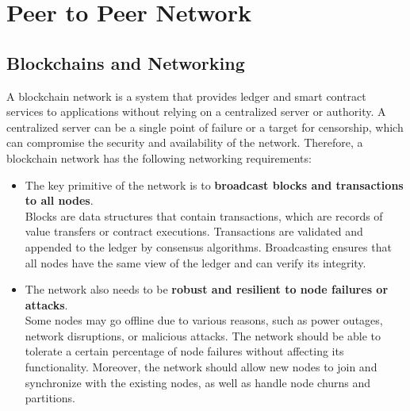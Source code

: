 \chapter{Peer to Peer Network}
\section{Blockchains and Networking}
A blockchain network is a system that provides ledger and smart contract services to applications without relying on a centralized server or authority. A centralized server can be a single point of failure or a target for censorship, which can compromise the security and availability of the network. Therefore, a blockchain network has the following networking requirements:
\begin{itemize}
    \item 
    The key primitive of the network is to \textbf{broadcast blocks and transactions to all nodes}.\\ Blocks are data structures that contain transactions, which are records of value transfers or contract executions. Transactions are validated and appended to the ledger by consensus algorithms. Broadcasting ensures that all nodes have the same view of the ledger and can verify its integrity.
    \item 
    The network also needs to be \textbf{robust and resilient to node failures or attacks}. \\ Some nodes may go offline due to various reasons, such as power outages, network disruptions, or malicious attacks. The network should be able to tolerate a certain percentage of node failures without affecting its functionality. Moreover, the network should allow new nodes to join and synchronize with the existing nodes, as well as handle node churns and partitions.
\end{itemize}
